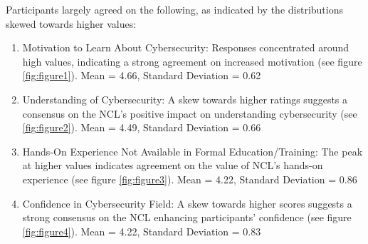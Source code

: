 \documentclass{article}
\begin{document}
Participants largely agreed on the following, as indicated by the distributions skewed towards higher values:
\begin{enumerate}[noitemsep]
\item Motivation to Learn About Cybersecurity: Responses concentrated around high values, indicating a strong agreement on increased motivation (see figure \ref{fig:figure1}). Mean = 4.66, Standard Deviation = 0.62
\item Understanding of Cybersecurity: A skew towards higher ratings suggests a consensus on the NCL's positive impact on understanding cybersecurity (see \ref{fig:figure2}). Mean = 4.49, Standard Deviation = 0.66
\item Hands-On Experience Not Available in Formal Education/Training: The peak at higher values indicates agreement on the value of NCL's hands-on experience (see figure \ref{fig:figure3}). Mean = 4.22, Standard Deviation = 0.86
\item Confidence in Cybersecurity Field: A skew towards higher scores suggests a strong consensus on the NCL enhancing participants' confidence (see figure \ref{fig:figure4}). Mean = 4.22, Standard Deviation = 0.83
\end{enumerate}
\end{document}
